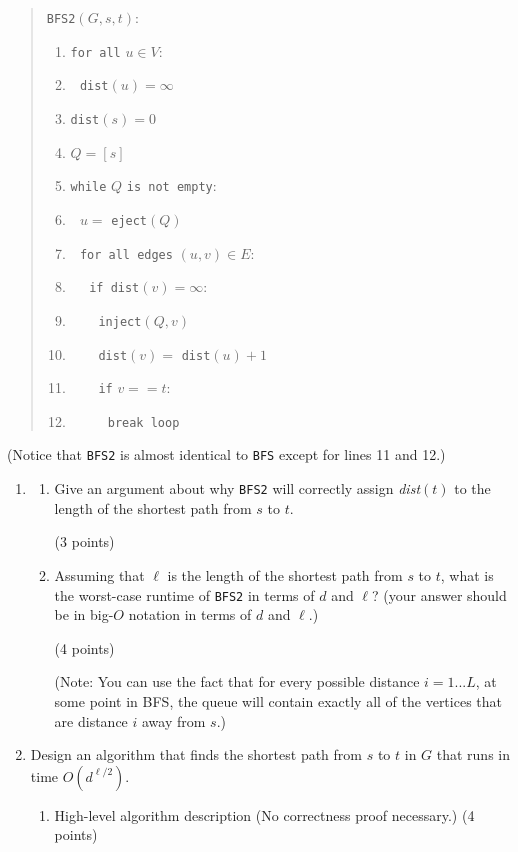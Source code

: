 \documentclass[10pt,letterpaper,unboxed,cm]{article}
\newcommand{\ind}{$~~~$}
\begin{document}
\begin{enumerate}
\begin{quote}
\texttt{BFS2}$(G,s,t)$:
\begin{enumerate}[(1)]
\item
\texttt{for all} $u\in V$:
\item
\ind \texttt{dist}$(u) = \infty$
\item
\texttt{dist}$(s) = 0$
\item
$Q = [s]$
\item
\texttt{while} $Q$ \texttt{is not empty}:
\item
\ind $u = $ \texttt{eject}$(Q)$
\item
\ind \texttt{for all edges} $(u,v) \in E$:
\item
\ind \ind \texttt{if dist}$(v) = \infty$:
\item
\ind\ind\ind \texttt{inject}$(Q,v)$
\item
\ind\ind\ind \texttt{dist}$(v) = $ \texttt{dist}$(u)+1$
\item
\ind\ind\ind \texttt{if} $v == t$:
\item
\ind\ind\ind\ind \texttt{break loop}
\end{enumerate}
\end{quote}

(Notice that \texttt{BFS2} is almost identical to \texttt{BFS} except for lines 11 and 12.)

\begin{enumerate}
\item
\begin{enumerate}
\item
Give an argument about why \texttt{BFS2} will correctly assign \emph{dist}$(t)$ to the length of the shortest path from $s$ to $t$.

(3 points)



\item
Assuming that $\ell$ is the length of the shortest path from $s$ to $t$, what is the worst-case runtime of \texttt{BFS2} in terms of $d$ and $\ell$? (your answer should be in big-$O$ notation in terms of $d$ and $\ell$.)

(4 points)

(Note: You can use the fact that for every possible distance $i=1...L$, at some point in BFS, the queue will contain exactly all of the vertices that are distance $i$ away from $s$.)


\end{enumerate}

\item
Design an algorithm that finds the shortest path from $s$ to $t$ in $G$ that runs in time $O(d^{\ell/2})$.
\begin{enumerate}
\item
High-level algorithm description (No correctness proof necessary.) (4 points)



\end{enumerate}
\end{enumerate}
\end{enumerate}
\end{document}
